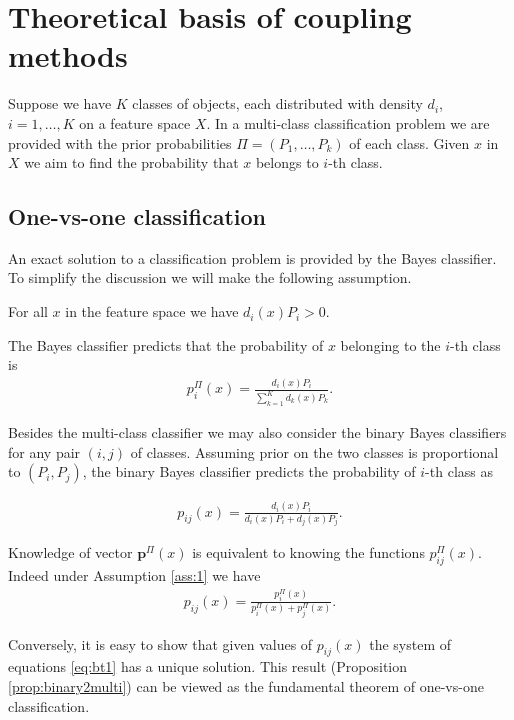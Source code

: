 \section{Theoretical basis of coupling methods} \label{sec:theory}

Suppose we have $K$ classes of objects, each distributed with density $d_i$, $i=1,\ldots, K$ on a feature space $X$. In a multi-class classification problem we are provided with the prior probabilities $\Pi = (P_1, \ldots, P_k)$ of each class. Given $x$ in $X$ we aim to find the probability that $x$ belongs to $i$-th class. 


\subsection{One-vs-one classification} \label{sec:one-vs-one}

An exact solution to a classification problem is provided by the Bayes classifier. To simplify the discussion we will make the following assumption.

\begin{assumption} \label{ass:1}
For all $x$ in the feature space we have $d_i(x) P_i > 0$.
\end{assumption}


The Bayes classifier predicts that the probability of $x$ belonging to the $i$-th class is
\begin{align}
 p^\Pi_i(x) = \frac{d_i(x) P_i}{\sum_{k=1}^K d_k(x)P_k}.
\end{align}

Besides the multi-class classifier we may also consider the binary Bayes classifiers for any pair $(i,j)$ of classes. Assuming prior on the two classes is proportional to $(P_i, P_j)$, the binary Bayes classifier predicts the probability of $i$-th class as 

\begin{align}
	p_{ij}(x) = \frac{d_i(x) P_i}{d_i(x)P_i + d_j(x)P_j}.
\end{align}

Knowledge of vector $\boldsymbol{p}^\Pi(x)$ is equivalent to knowing the functions $p^\Pi_{ij}(x)$. Indeed under Assumption \ref{ass:1} we have
\begin{align}
p_{ij}(x) = \frac{p_i^\Pi(x)}{p_i^\Pi(x) + p_j^\Pi(x)}. \label{eq:bt1}
\end{align}

Conversely, it is easy to show that  given values of $p_{ij}(x)$ the system of equations \eqref{eq:bt1} has a unique solution. This result (Proposition \ref{prop:binary2multi}) can be viewed as the fundamental theorem of one-vs-one classification.

